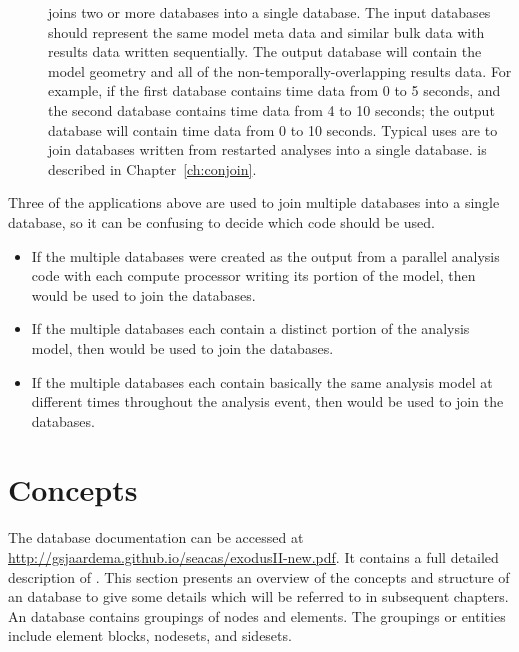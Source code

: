 \begin{description}
\item[\conjoin] joins two or more \exo{} databases into a single
database. The input databases should represent the same model meta
data and similar bulk data with results data written sequentially. The
output database will contain the model geometry and all of the
non-temporally-overlapping results data. For example, if the first
database contains time data from 0 to 5 seconds, and the second
database contains time data from 4 to 10 seconds; the output database
will contain time data from 0 to 10 seconds.  Typical uses are to join
databases written from restarted analyses into a single database.
\conjoin{} is described in Chapter~\ref{ch:conjoin}.
\end{description}

Three of the applications above are used to join multiple \exo{}
databases into a single \exo{} database, so it can be confusing to
decide which code should be used.
\begin{itemize}
\item If the multiple \exo{} databases were created as the output from a
parallel analysis code with each compute processor writing its portion
of the model, then \epu{} would be used to join the databases.

\item If the multiple \exo{} databases each contain a distinct portion of the
analysis model, then \ejoin{} would be used to join the databases.

\item If the multiple \exo{} databases each contain basically the same
analysis model at different times throughout the analysis event, then
\conjoin{} would be used to join the databases.

\end{itemize}

\section{\exo{} Concepts}
The \exo{} database documentation can be accessed at
\url{http://gsjaardema.github.io/seacas/exodusII-new.pdf}. It
contains a full detailed description of \exo{}. This section presents
an overview of the concepts and structure of an \exo{} database to give some
details which will be referred to in subsequent chapters. An \exo{}
database contains groupings of nodes and elements.  The groupings or
entities include element blocks, nodesets, and sidesets.

